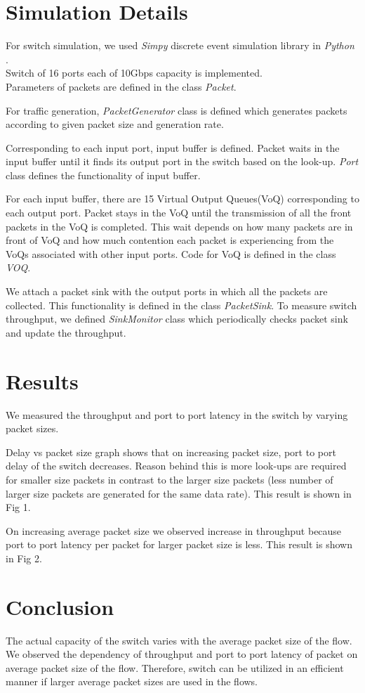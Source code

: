 \documentclass[twocolumn,10pt]{article}
\begin{document}
\section{Simulation Details}
For switch simulation, we used \textit{Simpy} discrete event simulation library in \textit{Python} .\\
Switch of 16 ports each of 10Gbps capacity is implemented.\\
Parameters of packets are defined in the class \textit{Packet}.

For traffic generation, \textit{PacketGenerator} class is defined which generates packets according to given packet size and generation rate.

Corresponding to each input port, input buffer is defined. Packet waits in the input buffer until it finds its output port in the switch based on the look-up.
\textit{Port} class defines the functionality of input buffer.

For each input buffer, there are 15 Virtual Output Queues(VoQ) corresponding to each output port.
Packet stays in the VoQ until the transmission of all the front packets in the VoQ is completed.
This wait depends on how many packets are in front of VoQ and how much contention each packet is experiencing from the VoQs associated with other input ports.
Code for VoQ is defined in the class \textit{VOQ}.

We attach a packet sink with the output ports in which all the packets are collected. This functionality is defined in the class \textit{PacketSink}.
To measure switch throughput, we defined \textit{SinkMonitor} class which periodically checks packet sink and update the throughput.

\section{Results}
We measured the throughput and port to port latency in the switch by varying packet sizes.
 
Delay vs packet size graph shows that on increasing packet size, port to port delay of the switch decreases. 
Reason behind this is more look-ups are required for smaller size packets in contrast to the larger size packets (less number of larger size packets are generated for the same data rate).
This result is shown in Fig 1.

On increasing average packet size we observed increase in throughput because port to port latency per packet for larger packet size is less.
This result is shown in Fig 2.

\section{Conclusion}
The actual capacity of the switch varies with the average packet size of the flow. We observed the dependency of throughput and port to port latency of packet on average packet size of the flow.
Therefore, switch can be utilized in an efficient manner if larger average packet sizes are used in the flows.
\end{document}
